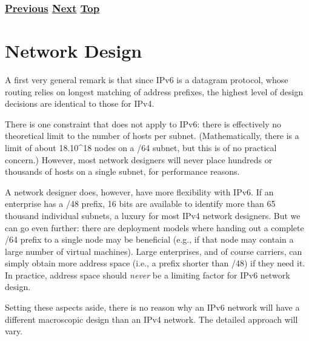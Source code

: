 \documentclass[
]{article}
\begin{document}
\subsubsection{\texorpdfstring{\hyperref[filtering]{Previous}
\hyperref[network-design]{Next}
\hyperref[security]{Top}}{Previous Next Top}}\label{previous-next-top-24}

\pagebreak

\section{Network Design}\label{network-design}

A first very general remark is that since IPv6 is a datagram protocol,
whose routing relies on longest matching of address prefixes, the
highest level of design decisions are identical to those for IPv4.

There is one constraint that does not apply to IPv6: there is
effectively no theoretical limit to the number of hosts per subnet.
(Mathematically, there is a limit of about 18.10\^{}18 nodes on a /64
subnet, but this is of no practical concern.) However, most network
designers will never place hundreds or thousands of hosts on a single
subnet, for performance reasons.

A network designer does, however, have more flexibility with IPv6. If an
enterprise has a /48 prefix, 16 bits are available to identify more than
65 thousand individual subnets, a luxury for most IPv4 network
designers. But we can go even further: there are deployment models where
handing out a complete /64 prefix to a single node may be beneficial
(e.g., if that node may contain a large number of virtual machines).
Large enterprises, and of course carriers, can simply obtain more
address space (i.e., a prefix shorter than /48) if they need it. In
practice, address space should \emph{never} be a limiting factor for
IPv6 network design.

Setting these aspects aside, there is no reason why an IPv6 network will
have a different macroscopic design than an IPv4 network. The detailed
approach will vary.
\end{document}
